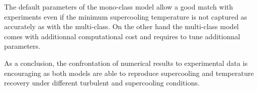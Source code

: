 The default parameters of the mono-class model allow a good match with experiments even if the minimum supercooling 
temperature is not captured as accurately as with the multi-class.
On the other hand the multi-class model comes with 
additionnal computational cost and requires to tune additionnal parameters.

As a conclusion, the confrontation of numerical results to experimental data is 
encouraging as both models are able to reproduce supercooling and temperature recovery 
under different turbulent and supercooling conditions.

\renewcommand{\labelitemi}{\textbullet}
